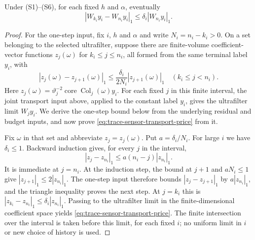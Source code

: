 \begin{lemma}\label{lem:trace-sensor-transport-price}
Under (S1)--(S6), for each fixed $h$ and $\alpha$, eventually
\begin{equation}
 |W_{k_i}y_i-W_{n_i}y_i|_1\le\delta_i|W_{n_i}y_i|_1.
 \label{eq:trace-sensor-transport-price}
\end{equation}
\end{lemma}
\nopagebreak
\begin{proof}
For the one-step input, fix $i$, $h$ and $\alpha$ and write
$N_i=n_i-k_i>0$. On a set belonging to the selected ultrafilter, suppose
there are finite-volume coefficient-vector functions $z_j(\omega)$ for
$k_i\le j\le n_i$, all formed from the same terminal label $y_i$, with
\begin{equation}
 |z_j(\omega)-z_{j+1}(\omega)|_1\le
 \frac{\delta_i}{2N_i}|z_{j+1}(\omega)|_1
 \quad(k_i\le j<n_i).
 \label{eq:trace-sensor-step-input}
\end{equation}
Here $z_j(\omega)=\vartheta_j^{-2}\operatorname{core}\operatorname{Col}_j(\omega)y_i$. For each
fixed $j$ in this finite interval, the joint transport input above, applied
to the constant label $y_i$, gives the ultrafilter limit $W_jy_i$. We derive
the one-step bound below from the underlying residual and budget inputs, and
now prove
\eqref{eq:trace-sensor-transport-price} from it.

Fix $\omega$ in that set and abbreviate $z_j=z_j(\omega)$. Put
$a=\delta_i/N_i$. For large $i$ we have $\delta_i\le1$. Backward
induction gives, for every $j$ in the interval,
\[
 |z_j-z_{n_i}|_1\le a(n_i-j)|z_{n_i}|_1.
\]
It is immediate at $j=n_i$. At the induction step, the bound at $j+1$
and $aN_i\le1$ give $|z_{j+1}|_1\le2|z_{n_i}|_1$. The one-step input
therefore bounds $|z_j-z_{j+1}|_1$ by $a|z_{n_i}|_1$, and the triangle
inequality proves the next step. At $j=k_i$ this is
$|z_{k_i}-z_{n_i}|_1\le\delta_i|z_{n_i}|_1$. Passing to the ultrafilter
limit in the finite-dimensional coefficient space yields
\eqref{eq:trace-sensor-transport-price}. The finite intersection over
the interval is taken before this limit, for each fixed $i$; no uniform
limit in $i$ or new choice of history is used.


\end{proof}
